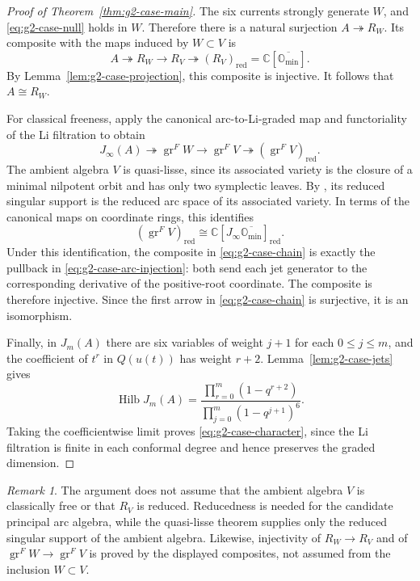\documentclass[11pt]{amsart}
\theoremstyle{definition}
\theoremstyle{remark}
\newtheorem{remark}[theorem]{Remark}
\newcommand{\C}{\mathbb C}
\DeclareMathOperator{\gr}{gr}
\newcommand{\red}{\mathrm{red}}
\begin{document}
\begin{proof}[Proof of Theorem~\ref{thm:g2-case-main}]
The six currents strongly generate $W$, and \eqref{eq:g2-case-null} holds in $W$.
Therefore there is a natural surjection $A\twoheadrightarrow R_W$.
Its composite with the maps induced by $W\subset V$ is
\[
 A\twoheadrightarrow R_W\longrightarrow R_V
 \twoheadrightarrow (R_V)_{\red}
 =\C[\overline{\mathbb O_{\min}}].
\]
By Lemma~\ref{lem:g2-case-projection}, this composite is injective.
It follows that $A\cong R_W$.

For classical freeness, apply the canonical arc-to-Li-graded map and
functoriality of the Li filtration to obtain
\begin{equation}\label{eq:g2-case-chain}
 J_\infty(A)\twoheadrightarrow\gr^FW
 \longrightarrow\gr^FV
 \twoheadrightarrow(\gr^FV)_{\red}.
\end{equation}
The ambient algebra $V$ is quasi-lisse, since its associated variety
is the closure of a minimal nilpotent orbit and has only two symplectic
leaves. By \cite[Theorem~9.2]{AMArc}, its reduced singular support is
the reduced arc space of its associated variety. In terms of the
canonical maps on coordinate rings, this identifies
\[
 (\gr^FV)_{\red}
 \cong \C[J_\infty\overline{\mathbb O_{\min}}]_{\red}.
\]
Under this identification, the composite in \eqref{eq:g2-case-chain} is exactly
the pullback in \eqref{eq:g2-case-arc-injection}: both send each jet generator
to the corresponding derivative of the positive-root coordinate.
The composite is therefore injective. Since the first arrow in
\eqref{eq:g2-case-chain} is surjective, it is an isomorphism.

Finally, in $J_m(A)$ there are six variables of weight $j+1$ for each
$0\leq j\leq m$, and the coefficient of $t^r$ in $Q(u(t))$ has
weight $r+2$. Lemma~\ref{lem:g2-case-jets} gives
\[
 \operatorname{Hilb}J_m(A)
 =\frac{\prod_{r=0}^{m}(1-q^{r+2})}
 {\prod_{j=0}^{m}(1-q^{j+1})^6}.
\]
Taking the coefficientwise limit proves \eqref{eq:g2-case-character}, since
the Li filtration is finite in each conformal degree and hence
preserves the graded dimension.
\end{proof}

\begin{remark}
The argument does not assume that the ambient algebra $V$ is
classically free or that $R_V$ is reduced. Reducedness is needed for
the candidate principal arc algebra, while the quasi-lisse theorem
supplies only the reduced singular support of the ambient algebra.
Likewise, injectivity of $R_W\to R_V$ and of
$\gr^FW\to\gr^FV$ is proved by the displayed
composites, not assumed from the inclusion $W\subset V$.
\end{remark}
\end{document}
